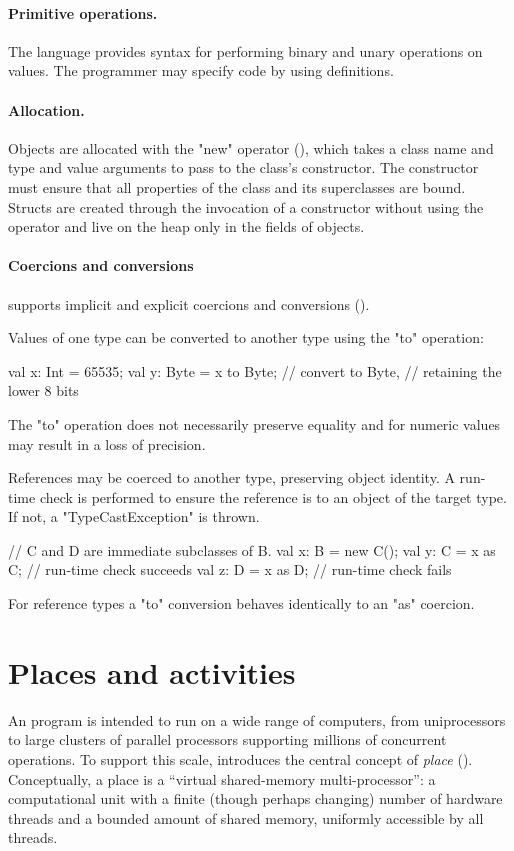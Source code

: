 \paragraph{Primitive operations.}  The language provides syntax for performing
binary and unary operations on values. The programmer may specify code
by using  definitions. 


\paragraph{Allocation.}
Objects are allocated with the \xcd"new" operator
(), which takes a class name and type and value
arguments to pass to the class's constructor.  The constructor must
ensure that all properties of the class and its superclasses are
bound. Structs are created through the invocation of a constructor
without using the  operator and live on the heap only in 
the fields of objects.

\paragraph{Coercions and conversions}
\Xten{} supports implicit and explicit coercions and
conversions ().

Values of one type can be converted to another type using the
\xcd"to" operation:
\begin{xten}
val x: Int = 65535;
val y: Byte = x to Byte; // convert to Byte,
                         // retaining the lower 8 bits
\end{xten}
The \xcd"to" operation does not necessarily preserve equality
and for numeric values may 
result in a loss of precision.

References may be coerced to another type, preserving object
identity.  A run-time check is performed to ensure the reference
is to an object of the target type.  If not,
a \xcd"TypeCastException" is thrown.
\begin{xten}
// C and D are immediate subclasses of B.
val x: B = new C();
val y: C = x as C; // run-time check succeeds
val z: D = x as D; // run-time check fails
\end{xten}
For reference types a \xcd"to" conversion behaves identically to
an \xcd"as" coercion.

\section{Places and activities}
An \Xten{} program is intended to run on a wide range of computers,
from uniprocessors to large clusters of parallel processors supporting
millions of concurrent operations. To support this scale, \Xten{}
introduces the central concept of \emph{place} ().
Conceptually, a place is a ``virtual shared-memory multi-processor'':
a computational unit with a finite (though perhaps changing) number of
hardware threads and a bounded amount of shared memory, uniformly
accessible by all threads.

